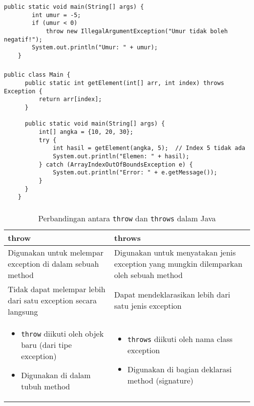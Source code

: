 \documentclass{../praktikum-ppt}
\begin{document}
    \begin{frame}[fragile]
      \frametitle{\insertsection}
      \begin{lstlisting}[caption={Contoh \textit{Throw}}]
    public static void main(String[] args) {
        int umur = -5;
        if (umur < 0) 
            throw new IllegalArgumentException("Umur tidak boleh negatif!");
        System.out.println("Umur: " + umur);
    }
      \end{lstlisting}
    \end{frame}

    \begin{frame}[fragile]
      \frametitle{\insertsection}
      \begin{lstlisting}[caption={Contoh \textit{Throws}}]
    public class Main {
      public static int getElement(int[] arr, int index) throws Exception {
          return arr[index];
      }
    
      public static void main(String[] args) {
          int[] angka = {10, 20, 30};
          try {
              int hasil = getElement(angka, 5);  // Index 5 tidak ada
              System.out.println("Elemen: " + hasil);
          } catch (ArrayIndexOutOfBoundsException e) {
              System.out.println("Error: " + e.getMessage());
          }
      }
    }
      \end{lstlisting} 
    \end{frame}

    \begin{frame}
      \frametitle{\insertsection}
      \begin{table}[h!]
        \centering
        \begin{tabular}{|p{6cm}|p{6cm}|}
        \hline
        \rowcolor{HIMAmuda}\textbf{throw} & \textbf{throws} \\
        \hline
        Digunakan untuk melempar exception di dalam sebuah method & Digunakan untuk menyatakan jenis exception yang mungkin dilemparkan oleh sebuah method \\
        \hline
        Tidak dapat melempar lebih dari satu exception secara langsung & Dapat mendeklarasikan lebih dari satu jenis exception \\
        \hline
        \begin{itemize}
            \item \texttt{throw} diikuti oleh objek baru (dari tipe exception)
            \item Digunakan di dalam tubuh method
        \end{itemize} 
        & 
        \begin{itemize}
            \item \texttt{throws} diikuti oleh nama class exception
            \item Digunakan di bagian deklarasi method (signature)
        \end{itemize} \\
        \hline
        \end{tabular}
        \caption{Perbandingan antara \texttt{throw} dan \texttt{throws} dalam Java}
        \end{table}
    \end{frame}
\end{document}
